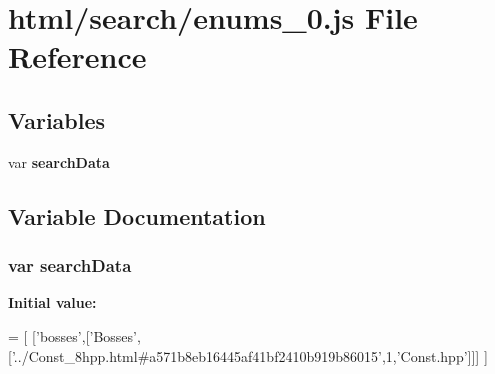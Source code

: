 \section{html/search/enums\-\_\-0.js File Reference}
\label{enums__0_8js}
\subsection*{Variables}
\begin{DoxyCompactItemize}
\item 
var {\bf search\-Data}
\end{DoxyCompactItemize}


\subsection{Variable Documentation}
\subsubsection[{search\-Data}]{\setlength{\rightskip}{0pt plus 5cm}var search\-Data}\label{enums__0_8js_ad01a7523f103d6242ef9b0451861231e}
{\bfseries Initial value\-:}
\begin{DoxyCode}
=
[
  [\textcolor{stringliteral}{'bosses'},[\textcolor{stringliteral}{'Bosses'},[\textcolor{stringliteral}{'../Const\_8hpp.html#a571b8eb16445af41bf2410b919b86015'},1,\textcolor{stringliteral}{'Const.hpp'}]]]
]
\end{DoxyCode}
